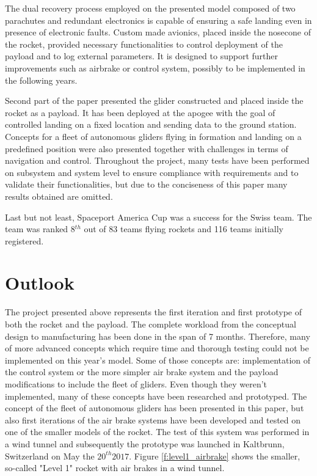\documentclass[]{iac}
\begin{document}
The dual recovery process employed on the presented model composed of two parachutes and redundant electronics is capable of ensuring a safe landing even in presence of electronic faults. Custom made avionics, placed inside the nosecone of the rocket, provided necessary functionalities to control deployment of the payload and to log external parameters. It is designed to support further improvements such as airbrake or control system, possibly to be implemented in the following years.

Second part of the paper presented the glider constructed and placed inside the rocket as a payload. It has been deployed at the apogee with the goal of controlled landing on a fixed location and sending data to the ground station. Concepts for a fleet of autonomous gliders flying in formation and landing on a predefined position were also presented together with challenges in terms of navigation and control. Throughout the project, many tests have been performed on subsystem and system level to ensure compliance with requirements and to validate their functionalities, but due to the conciseness of this paper many results obtained are omitted.

Last but not least, Spaceport America Cup was a success for the Swiss team. The team was ranked 8$^{th}$ out of 83 teams flying rockets and 116 teams initially registered.

\section{Outlook}
The project presented above represents the first iteration and first prototype of both the rocket and the payload. The complete workload from the conceptual design to manufacturing has been done in the span of 7 months. Therefore, many of more advanced concepts which require time and thorough testing could not be implemented on this year's model. Some of those concepts are: implementation of the control system or the more simpler air brake system and the payload modifications to include the fleet of gliders. Even though they weren't implemented, many of these concepts have been researched and prototyped. The concept of the fleet of autonomous gliders has been presented in this paper, but also first iterations of the air brake systems have been developed and tested on one of the smaller models of the rocket. The test of this system was performed in a wind tunnel and subsequently the prototype was launched in Kaltbrunn, Switzerland on May the $20^{th} 2017$. Figure \ref{f:level1_airbrake} shows the smaller, so-called "Level 1" rocket with air brakes in a wind tunnel. 
\end{document}
